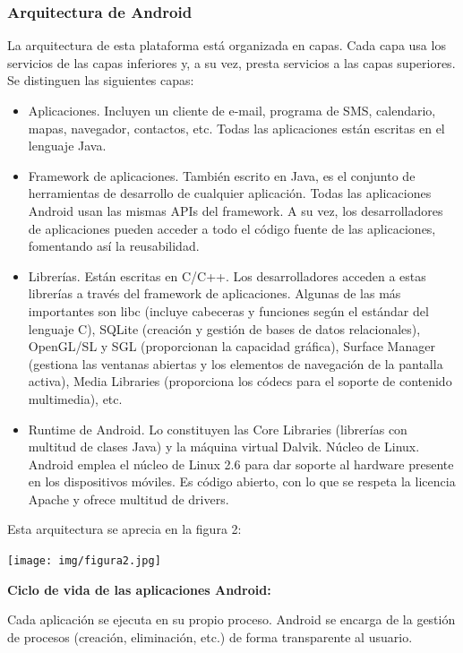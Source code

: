 \documentclass[12 pt, a4paper, twoside]{article}
\begin{document}
\subsubsection{Arquitectura de Android}
La arquitectura de esta plataforma está organizada en capas. Cada capa usa los
servicios de las capas inferiores y, a su vez, presta servicios a las capas superiores.
Se distinguen las siguientes capas:
\begin{itemize}
\item Aplicaciones. Incluyen un cliente de e-mail, programa de SMS, calendario,
mapas, navegador, contactos, etc. Todas las aplicaciones están escritas en el
lenguaje Java.
\item Framework de aplicaciones. También escrito en Java, es el conjunto de
herramientas de desarrollo de cualquier aplicación. Todas las aplicaciones
Android usan las mismas APIs del framework. A su vez, los desarrolladores
de aplicaciones pueden acceder a todo el código fuente de las aplicaciones,
fomentando así la reusabilidad.
\item Librerías. Están escritas en C/C++. Los desarrolladores acceden a estas
librerías a través del framework de aplicaciones. Algunas de las más importantes
son libc (incluye cabeceras y funciones según el estándar del lenguaje
C), SQLite (creación y gestión de bases de datos relacionales), OpenGL/SL
y SGL (proporcionan la capacidad gráfica), Surface Manager (gestiona las
ventanas abiertas y los elementos de navegación de la pantalla activa), Media
Libraries (proporciona los códecs para el soporte de contenido multimedia),
etc.
\item Runtime de Android. Lo constituyen las Core Libraries (librerías con
multitud de clases Java) y la máquina virtual Dalvik.
Núcleo de Linux. Android emplea el núcleo de Linux 2.6 para dar soporte
al hardware presente en los dispositivos móviles. Es código abierto, con lo
que se respeta la licencia Apache y ofrece multitud de drivers.
\end{itemize}
\clearpage
Esta arquitectura se aprecia en la figura 2:
\begin{center}
  \texttt{[image: img/figura2.jpg]}
\end{center}
\textbf{Ciclo de vida de las aplicaciones Android:}

Cada aplicación se ejecuta en su propio proceso. Android se encarga de la
gestión de procesos (creación, eliminación, etc.) de forma transparente al usuario.
\end{document}
